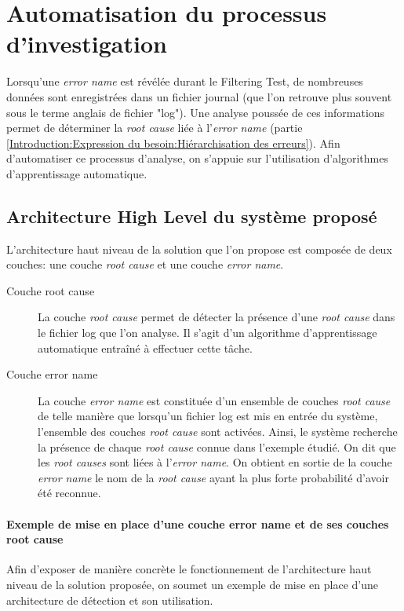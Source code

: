 \chapter{Automatisation du processus d'investigation}
\label{Automatisation du processus d'investigation}
\thispagestyle{fancy}
Lorsqu'une \emph{error name} est révélée durant le Filtering Test, de nombreuses données sont enregistrées dans un fichier journal (que l'on retrouve plus souvent sous le terme anglais de fichier "log"). Une analyse poussée de ces informations permet de déterminer la \emph{root cause} liée à l'\emph{error name} (partie \ref{Introduction:Expression du besoin:Hiérarchisation des erreurs}). Afin d'automatiser ce processus d'analyse, on s'appuie sur l'utilisation d'algorithmes d'apprentissage automatique. 

\section{Architecture High Level du système proposé}
\label{Automatisation du processus d'investigation: Achitecture High Level du système proposé}
L'architecture haut niveau de la solution que l'on propose est composée de deux couches: une couche \emph{root cause} et une couche \emph{error name}.
\begin{description}
	\item [Couche root cause] La couche \emph{root cause} permet de détecter la présence d'une \emph{root cause} dans le fichier log que l'on analyse. Il s'agit d'un algorithme d'apprentissage automatique entraîné à effectuer cette tâche.
	\item [Couche error name] La couche \emph{error name} est constituée d'un ensemble de couches \emph{root cause} de telle manière que lorsqu'un fichier log est mis en entrée du système, l'ensemble des couches \emph{root cause} sont activées. Ainsi, le système recherche la présence de chaque \emph{root cause} connue dans l'exemple étudié. On dit que les \emph{root causes} sont liées à l'\emph{error name}. On obtient en sortie de la couche \emph{error name} le nom de la \emph{root cause} ayant la plus forte probabilité d'avoir été reconnue.
\end{description} 

\subsubsection{Exemple de mise en place  d'une couche error name et de ses couches root cause}
\label{Automatisation du processus d'investigation: Achitecture High Level du système proposé: Exemple de mise en place  d'une couche error name et de ses couches root cause}
Afin d'exposer de manière concrète le fonctionnement de l'architecture haut niveau de la solution proposée, on soumet un exemple de mise en place d'une architecture de détection et son utilisation. \\

